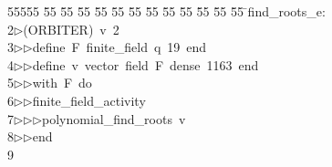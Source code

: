 %
%
\begin{tabbing}
55555 \= 55 \= 55 \= 55 \= 55 \= 55 \= 55 \= 55 \= 55 \= 55 \= 55 \= 55 \= 55 \= \>find\_roots\_e:\\[0pt]
2\>$\triangleright$\>(ORBITER)\ v\ 2\ \\[0pt]
3\>$\triangleright$\>$\triangleright$\>define\ F\ finite\_field\ q\ 19\ end\ \\[0pt]
4\>$\triangleright$\>$\triangleright$\>define\ v\ vector\ field\ F\ dense\ 1163\ end\ \\[0pt]
5\>$\triangleright$\>$\triangleright$\>with\ F\ do\ \\[0pt]
6\>$\triangleright$\>$\triangleright$\>finite\_field\_activity\ \\[0pt]
7\>$\triangleright$\>$\triangleright$\>$\triangleright$\>polynomial\_find\_roots\ v\ \\[0pt]
8\>$\triangleright$\>$\triangleright$\>end\\[0pt]
9\>\end{tabbing}

